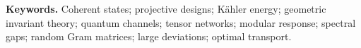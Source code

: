 \documentclass[11pt]{article}
\begin{document}
\vspace{5pt}
\noindent\textbf{Keywords.} Coherent states; projective designs; K\"ahler energy;
geometric invariant theory; quantum channels; tensor networks; modular response;
spectral gaps; random Gram matrices; large deviations; optimal transport.
\clearpage
\begingroup
\small
\setlength{\parskip}{0pt}
\tableofcontents
\endgroup
\clearpage











\clearpage


\end{document}
